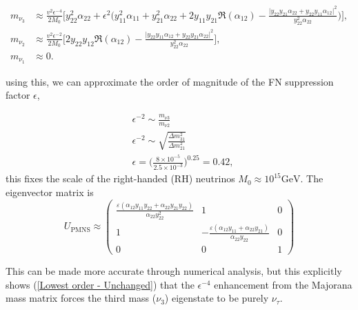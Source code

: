 \begin{widetext}
\begin{equation}\label{NormalHierarchy}
\begin{aligned}
    m_{\nu_3} &\approx \frac{v^2 \epsilon^{-4}}{2M_0}\Bigg[
    y_{22}^2\alpha_{22}
    + \epsilon^{2}\Big(
    y_{11}^2\alpha_{11} + y_{21}^2\alpha_{22}
    + 2y_{11}y_{21}\Re(\alpha_{12}) 
    -\frac{\big|y_{22}y_{21}\alpha_{22}+y_{22}y_{11}\alpha_{12}\big|^2}{y_{22}^2 \alpha_{22}}
    \Big)
    \Bigg],\\[6pt]
    m_{\nu_2} &\approx \frac{v^2 \epsilon^{-2}}{2 M_0}\Bigg[
    2y_{22}y_{12}\Re(\alpha_{12})
    -\frac{\big|y_{22}y_{11}\alpha_{12}+y_{22}y_{21}\alpha_{22}\big|^2}{y_{22}^2 \alpha_{22}}
    \Bigg],\\[4pt]
    m_{\nu_1} &\approx 0 .
\end{aligned}
\end{equation}
\end{widetext}

using this, we can approximate the order of magnitude of the FN suppression factor $\epsilon$,

\begin{align}    
    &\epsilon^{-2} \sim \frac{m_{\nu 3}}{m_{\nu 2}}   \\
    &\epsilon^{-2} \sim \sqrt{\frac{\Delta m^2_{31}}{\Delta m^2_{21}}} \\
    &\epsilon = \Big(\frac{8 \times 10^{-5}}{2.5 \times 10^{-3}} \Big)^{0.25} = 0.42,
\end{align}
this fixes the scale of the right-handed (RH) neutrinos $M_0 \approx 10^ {15} \text{GeV}$. The eigenvector matrix is 
\begin{equation}
    U_{\text{PMNS}} \approx 
    \begin{pmatrix}
         \frac{\varepsilon  (\alpha_{12} y_{11} y_{22} + \alpha_{22} y_{21} y_{22})}{\alpha_{22} y_{22}^2} & 1 & 0 \\
         1 & -\frac{\varepsilon  (\alpha_{12} y_{11}+\alpha_{22} y_{21})}{\alpha_{22} y_{22}} & 0 \\
         0 & 0 & 1
    \end{pmatrix}
\end{equation}

This can be made more accurate through numerical analysis, but this explicitly shows (\cref{Lowest order - Unchanged}) that the $\epsilon^{-4}$ enhancement from the Majorana mass matrix forces the third mass ($\nu_3$) eigenstate to be purely $\nu_\tau$.

